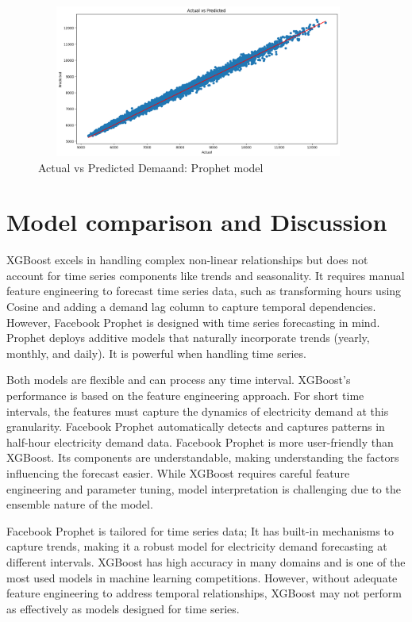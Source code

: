 \documentclass[mstat,12pt]{unswthesis}
\begin{document}
\begin{figure}[H]
\centering
\includegraphics[width=0.95\textwidth, height=5cm]{prophet_actual_predict.png}
\caption{Actual vs Predicted Demaand: Prophet model}\label{prophet_actual}
\end{figure}

\chapter{Model comparison and
Discussion}\label{model-comparison-and-discussion}

XGBoost excels in handling complex non-linear relationships but does not
account for time series components like trends and seasonality. It
requires manual feature engineering to forecast time series data, such
as transforming hours using Cosine and adding a demand lag column to
capture temporal dependencies. However, Facebook Prophet is designed
with time series forecasting in mind. Prophet deploys additive models
that naturally incorporate trends (yearly, monthly, and daily). It is
powerful when handling time series.

Both models are flexible and can process any time interval. XGBoost's
performance is based on the feature engineering approach. For short time
intervals, the features must capture the dynamics of electricity demand
at this granularity. Facebook Prophet automatically detects and captures
patterns in half-hour electricity demand data. Facebook Prophet is more
user-friendly than XGBoost. Its components are understandable, making
understanding the factors influencing the forecast easier. While XGBoost
requires careful feature engineering and parameter tuning, model
interpretation is challenging due to the ensemble nature of the model.

Facebook Prophet is tailored for time series data; It has built-in
mechanisms to capture trends, making it a robust model for electricity
demand forecasting at different intervals. XGBoost has high accuracy in
many domains and is one of the most used models in machine learning
competitions. However, without adequate feature engineering to address
temporal relationships, XGBoost may not perform as effectively as models
designed for time series.
\end{document}
